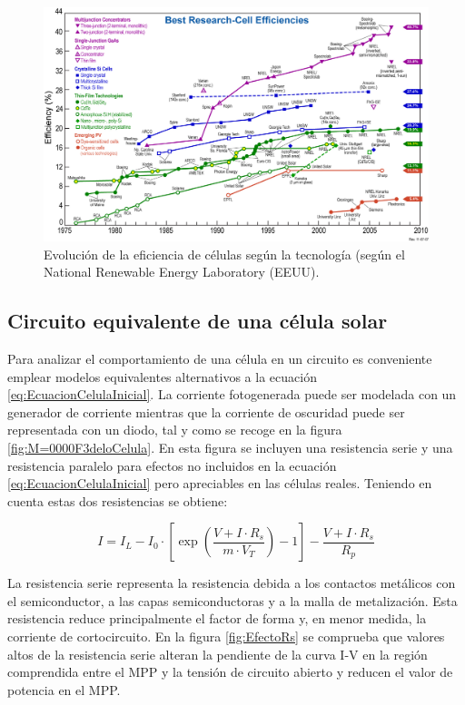 %
\begin{figure}
\includegraphics[scale=0.35]{../figs/PVeff(rev110707)d}\caption{Evolución de la eficiencia de células según la tecnología (según el
National Renewable Energy Laboratory (EEUU).\label{fig:EvolucionEficienciaC=0000E9lulas}}

\end{figure}



\subsection{Circuito equivalente de una célula solar}

Para analizar el comportamiento de una célula en un circuito es conveniente
emplear modelos equivalentes alternativos a la ecuación \ref{eq:EcuacionCelulaInicial}.
La corriente fotogenerada puede ser modelada con un generador de corriente
mientras que la corriente de oscuridad puede ser representada con
un diodo, tal y como se recoge en la figura \ref{fig:M=0000F3deloCelula}.
En esta figura se incluyen una resistencia serie y una resistencia
paralelo para efectos no incluidos en la ecuación \ref{eq:EcuacionCelulaInicial}
pero apreciables en las células reales. Teniendo en cuenta estas dos
resistencias se obtiene:

\begin{equation}
I=I_{L}-I_{0}\cdot[\exp(\frac{V+I\cdot R_{s}}{m\cdot V_{T}})-1]-\frac{V+I\cdot R_{s}}{R_{p}}\label{eq:CorrienteCelulaRsRp}\end{equation}

La resistencia serie representa la resistencia debida a los contactos
metálicos con el semiconductor, a las capas semiconductoras y a la
malla de metalización. Esta resistencia reduce principalmente el factor
de forma y, en menor medida, la corriente de cortocircuito. En la
figura \ref{fig:EfectoRs} se comprueba que valores altos de la resistencia
serie alteran la pendiente de la curva I-V en la región comprendida
entre el MPP y la tensión de circuito abierto y reducen el valor de
potencia en el MPP.

